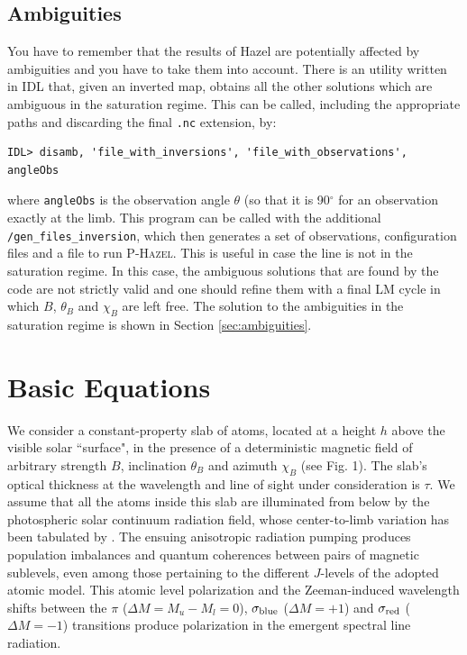 \documentclass[12pt]{article}
\def\HM{\textsc{P-Hazel}}
\begin{document}
\subsection{Ambiguities}
You have to remember that the results of Hazel are potentially affected by ambiguities and you have
to take them into account. There is an utility written in IDL that, given an inverted map, obtains
all the other solutions which are ambiguous in the saturation regime. This can be called, including the
appropriate paths and discarding the final \texttt{.nc} extension, by:
\begin{verbatim}
IDL> disamb, 'file_with_inversions', 'file_with_observations', angleObs
\end{verbatim}
where \texttt{angleObs} is the observation angle $\theta$ (so that it is 90$^\circ$ for an observation
exactly at the limb.
This program can be called with the additional \texttt{/gen\_files\_inversion}, which then generates
a set of observations, configuration files and a file to run \HM. This is useful in case the line is not
in the saturation regime. In this case, the ambiguous solutions that are found by the code are
not strictly valid and one should refine them with a final LM cycle in which $B$, $\theta_B$ and $\chi_B$
are left free. The solution to the ambiguities in the saturation regime is shown in Section \ref{sec:ambiguities}.


\section{Basic Equations}
We consider a constant-property slab of atoms, located at a height
$h$ above the 
visible solar ``surface", in the presence of a deterministic magnetic field of
arbitrary strength $B$, 
inclination $\theta_B$ and azimuth $\chi_B$ (see Fig. 1). The slab's optical
thickness at the wavelength 
and line of sight under consideration is $\tau$.
We assume that all the atoms inside this slab are illuminated from below by the
photospheric solar continuum radiation field, whose center-to-limb variation has
been tabulated by \cite{pierce00}. The ensuing anisotropic radiation pumping
produces population imbalances and quantum coherences between pairs of magnetic
sublevels, even among those pertaining to the different $J$-levels of the
adopted atomic model. This atomic level polarization and the Zeeman-induced
wavelength shifts between the $\pi$ ($\Delta{M}=M_u-M_l=0$), $\sigma_{\rm blue}$
($\Delta{M}=+1$) and $\sigma_{\rm red}$ ($\Delta{M}=-1$) transitions produce
polarization in the emergent spectral line radiation.
\end{document}
